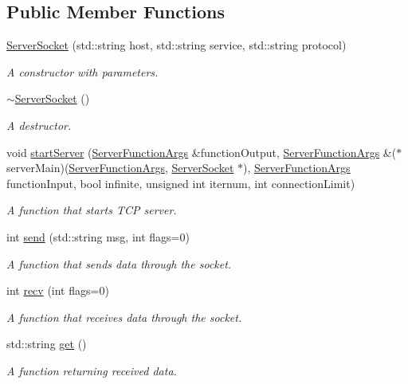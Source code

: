 \subsection*{Public Member Functions}
\begin{DoxyCompactItemize}
\item 
\hyperlink{class_net_socket_p_p_1_1_server_socket_a79fb1d52a8dfedaa7f58f904d38d68c0}{Server\-Socket} (std\-::string host, std\-::string service, std\-::string protocol)
\begin{DoxyCompactList}\small\item\em A constructor with parameters. \end{DoxyCompactList}\item 
\hypertarget{class_net_socket_p_p_1_1_server_socket_a510674d924c2544e6b0069e39c36516b}{\hyperlink{class_net_socket_p_p_1_1_server_socket_a510674d924c2544e6b0069e39c36516b}{$\sim$\-Server\-Socket} ()}\label{class_net_socket_p_p_1_1_server_socket_a510674d924c2544e6b0069e39c36516b}

\begin{DoxyCompactList}\small\item\em A destructor. \end{DoxyCompactList}\item 
void \hyperlink{class_net_socket_p_p_1_1_server_socket_a51754d1c346300072a94f4b392a87d38}{start\-Server} (\hyperlink{class_net_socket_p_p_1_1_server_function_args}{Server\-Function\-Args} \&function\-Output, \hyperlink{class_net_socket_p_p_1_1_server_function_args}{Server\-Function\-Args} \&($\ast$server\-Main)(\hyperlink{class_net_socket_p_p_1_1_server_function_args}{Server\-Function\-Args}, \hyperlink{class_net_socket_p_p_1_1_server_socket}{Server\-Socket} $\ast$), \hyperlink{class_net_socket_p_p_1_1_server_function_args}{Server\-Function\-Args} function\-Input, bool infinite, unsigned int iternum, int connection\-Limit)
\begin{DoxyCompactList}\small\item\em A function that starts T\-C\-P server. \end{DoxyCompactList}\item 
int \hyperlink{class_net_socket_p_p_1_1_server_socket_a8bd2cc82d02a5997119b6abdc9d2f1a9}{send} (std\-::string msg, int flags=0)
\begin{DoxyCompactList}\small\item\em A function that sends data through the socket. \end{DoxyCompactList}\item 
int \hyperlink{class_net_socket_p_p_1_1_server_socket_a2e0203c59bfa247f0252e6e13064c6af}{recv} (int flags=0)
\begin{DoxyCompactList}\small\item\em A function that receives data through the socket. \end{DoxyCompactList}\item 
std\-::string \hyperlink{class_net_socket_p_p_1_1_server_socket_a94e3eddcfdb2f04d8f30fb50006d0515}{get} ()
\begin{DoxyCompactList}\small\item\em A function returning received data. \end{DoxyCompactList}\end{DoxyCompactItemize}
